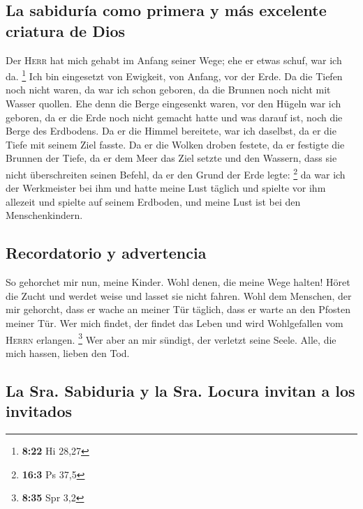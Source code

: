\hypertarget{la-sabiduruxeda-como-primera-y-muxe1s-excelente-criatura-de-dios}{%
\subsection{La sabiduría como primera y más excelente criatura de
Dios}\label{la-sabiduruxeda-como-primera-y-muxe1s-excelente-criatura-de-dios}}

 Der \textsc{Herr} hat mich gehabt im Anfang seiner Wege;
ehe er etwas schuf, war ich da. \footnote{\textbf{8:22} Hi 28,27}
 Ich bin eingesetzt von Ewigkeit, von Anfang, vor der
Erde.  Da die Tiefen noch nicht waren, da war ich schon
geboren, da die Brunnen noch nicht mit Wasser quollen. 
Ehe denn die Berge eingesenkt waren, vor den Hügeln war ich geboren,
 da er die Erde noch nicht gemacht hatte und was darauf
ist, noch die Berge des Erdbodens.  Da er die Himmel
bereitete, war ich daselbst, da er die Tiefe mit seinem Ziel fasste.
 Da er die Wolken droben festete, da er festigte die
Brunnen der Tiefe,  da er dem Meer das Ziel setzte und
den Wassern, dass sie nicht überschreiten seinen Befehl, da er den Grund
der Erde legte: \footnote{\textbf{16:3} Ps 37,5}  da war
ich der Werkmeister bei ihm und hatte meine Lust täglich und spielte vor
ihm allezeit  und spielte auf seinem Erdboden, und meine
Lust ist bei den Menschenkindern.

\hypertarget{recordatorio-y-advertencia}{%
\subsection{Recordatorio y
advertencia}\label{recordatorio-y-advertencia}}

 So gehorchet mir nun, meine Kinder. Wohl denen, die
meine Wege halten!  Höret die Zucht und werdet weise und
lasset sie nicht fahren.  Wohl dem Menschen, der mir
gehorcht, dass er wache an meiner Tür täglich, dass er warte an den
Pfosten meiner Tür.  Wer mich findet, der findet das
Leben und wird Wohlgefallen vom \textsc{Herrn} erlangen. \footnote{\textbf{8:35}
  Spr 3,2}  Wer aber an mir sündigt, der verletzt seine
Seele. Alle, die mich hassen, lieben den Tod.

\hypertarget{la-sra.-sabiduria-y-la-sra.-locura-invitan-a-los-invitados}{%
\subsection{La Sra. Sabiduria y la Sra. Locura invitan a los
invitados}\label{la-sra.-sabiduria-y-la-sra.-locura-invitan-a-los-invitados}}

